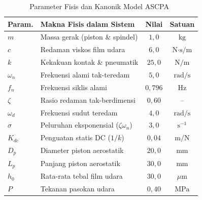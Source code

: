 \documentclass[journal]{IEEEtran}
\begin{document}
\begin{table}[!t]
\caption{Parameter Fisis dan Kanonik Model ASCPA~\cite{yang2026signal}}
\label{tab:parameters}
\centering
\footnotesize
\begin{tabular}{@{}llcc@{}}
\toprule
\textbf{Param.} & \textbf{Makna Fisis dalam Sistem} & \textbf{Nilai} & \textbf{Satuan} \\
\midrule
$m$ & Massa gerak (piston \& spindel) & $1{,}0$ & $\text{kg}$ \\
$c$ & Redaman viskos film udara & $6{,}0$ & $\text{N}\cdot\text{s/m}$ \\
$k$ & Kekakuan kontak \& pneumatik & $25{,}0$ & $\text{N/m}$ \\
$\omega_n$ & Frekuensi alami tak-teredam & $5{,}0$ & $\text{rad/s}$ \\
$f_n$ & Frekuensi siklis alami & $0{,}796$ & $\text{Hz}$ \\
$\zeta$ & Rasio redaman tak-berdimensi & $0{,}60$ & -- \\
$\omega_d$ & Frekuensi sudut teredam & $4{,}0$ & $\text{rad/s}$ \\
$\sigma$ & Peluruhan eksponensial ($\zeta \omega_n$) & $3{,}0$ & $\text{s}^{-1}$ \\
$K_{dc}$ & Penguatan statis DC ($1/k$) & $0{,}04$ & $\text{m/N}$ \\
$D_p$ & Diameter piston aerostatik & $20{,}0$ & $\text{mm}$ \\
$L_p$ & Panjang piston aerostatik & $30{,}0$ & $\text{mm}$ \\
$h_0$ & Rata-rata tebal film udara & $30{,}0$ & $\mu\text{m}$ \\
$P$ & Tekanan pasokan udara & $0{,}40$ & $\text{MPa}$ \\
\bottomrule
\end{tabular}
\end{table}
\end{document}
